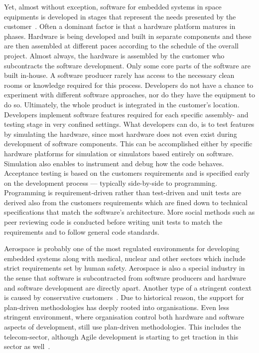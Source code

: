 \documentclass[english]{tktltiki2}
\begin{document}
Yet, almost without exception, software for embedded systems in space equipments is developed in stages that represent the needs presented by the customer~\cite{Hol15b}. Often a dominant factor is that a hardware platform matures in phases. Hardware is being developed and built in separate components and these are then assembled at different paces according to the schedule of the overall project. Almost always, the hardware is assembled by the customer who subcontracts the software development. Only some core parts of the software are built in-house. A software producer rarely has access to the necessary clean rooms or knowledge required for this process. Developers do not have a chance to experiment with different software approaches, nor do they have the equipment to do so. Ultimately, the whole product is integrated in the customer’s location. Developers implement software features required for each specific assembly- and testing stage in very confined settings. What developers can do, is to test features by simulating the hardware, since most hardware does not even exist during development of software components. This can be accomplished either by specific hardware platforms for simulation or simulators based entirely on software. Simulation also enables to instrument and debug how the code behaves. Acceptance testing is based on the customers requirements and is specified early on the development process — typically side-by-side to programming. Programming is requirement-driven rather than test-driven and unit tests are derived also from the customers requirements which are fined down to technical specifications that match the software’s architecture. More social methods such as peer reviewing code is conducted before writing unit tests to match the requirements and to follow general code standards.

Aerospace is probably one of the most regulated environments for developing embedded systems along with medical, nuclear and other sectors which include strict requirements set by human safety. Aerospace is also a special industry in the sense that software is subcontracted from software producers and hardware and software development are directly apart. Another type of a stringent context is caused by conservative customers~\cite{Koi15}. Due to historical reason, the support for plan-driven methodologies has deeply rooted into organisations. Even less stringent environment, where organisation control both hardware and software aspects of development, still use plan-driven methodologies. This includes the telecom-sector, although Agile development is starting to get traction in this sector as well~\cite{LTR14}.
\end{document}
